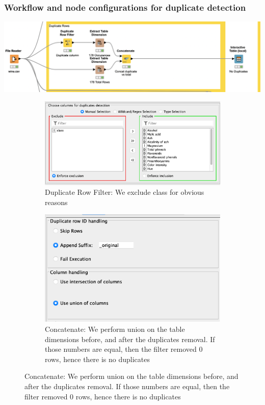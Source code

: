 \documentclass[11pt]{article}
\begin{document}
			\subsubsection*{Workflow and node configurations for duplicate detection}
			\iftrue
			\begin{center}
				\includegraphics[scale=0.5]{res/t0/t02/t02-workflow}
			\end{center}
			\fi
			\iftrue
			\begin{figure}[H]
				\centering
				\begin{subfigure}{0.4\textwidth}
					\includegraphics[width=\textwidth]{res/t0/t02/t02-duplicate-filter-conf}
					\caption{Duplicate Row Filter: We exclude class for obvious reasons}
					\label{fig:first}
				\end{subfigure}
				\hfill
				\begin{subfigure}{0.4\textwidth}
					\includegraphics[width=\textwidth]{res/t0/t02/t02-concat-conf}
					\caption{Concatenate: We perform union on the table dimensions before, and after the duplicates removal. If those numbers are equal, then the filter removed 0 rows, hence there is no duplicates}
					\label{fig:second}
				\end{subfigure}
				\hfill
			\end{figure}
			\fi
\end{document}
